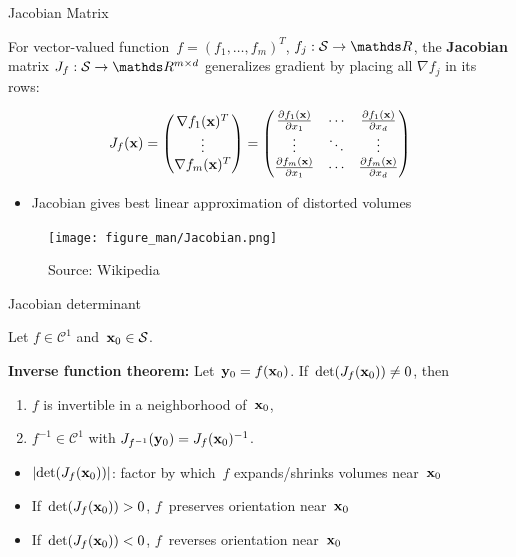 \documentclass[11pt,compress,t,notes=noshow, xcolor=table]{beamer}
\begin{document}
\begin{vbframe}{Jacobian Matrix}

For vector-valued function~$f = (f_1,\dots,f_m)^T$, $f_j:\mathcal{S}\to\R$, the \textbf{Jacobian} matrix $J_f:\mathcal{S} \to \R^{m\times d}$ generalizes gradient by placing all $\nabla f_j$ in its rows:

\begin{equation*}
    J_f(\mathbf{x}) = \begin{pmatrix}
        \nabla f_1(\mathbf{x})^T \\
        \vdots \\
        \nabla f_m(\mathbf{x})^T 
	\end{pmatrix}
    =
    \begin{pmatrix}
        \frac{\partial f_1(\mathbf{x})}{\partial x_1} & \cdots & \frac{\partial f_1(\mathbf{x})}{\partial x_d} \\
        \vdots &  \ddots & \vdots \\
        \frac{\partial f_m(\mathbf{x})}{\partial x_1} & \cdots & \frac{\partial f_m(\mathbf{x})}{\partial x_d}
	\end{pmatrix}
\end{equation*}

\begin{itemize}
    \item Jacobian gives best linear approximation of distorted volumes
\end{itemize}

\begin{figure}
    \centering
    \texttt{[image: figure\_man/Jacobian.png]}
    \caption*{\footnotesize Source: Wikipedia}
\end{figure}

\end{vbframe}


\begin{vbframe}{Jacobian determinant}

Let $f\in\mathcal{C}^1$ and~$\mathbf{x}_0\in\mathcal{S}$.

\begin{kframe}
    \textbf{Inverse function theorem:} Let~$\mathbf{y}_0=f(\mathbf{x}_0)$.
        If~$\det(J_f(\mathbf{x}_0))\not=0$, then
        \begin{enumerate}
            \item $f$ is invertible in a neighborhood of~$\mathbf{x}_0$,
            \item $f^{-1}\in\mathcal{C}^1$ with $J_{f^{-1}}(\mathbf{y}_0) = J_f(\mathbf{x}_0)^{-1}$.
        \end{enumerate}
\end{kframe}

\begin{itemize}
    \item $|{\det(J_f(\mathbf{x}_0))}|$: factor by which~$f$ expands/shrinks volumes near~$\mathbf{x}_0$
    \item If~$\det(J_f(\mathbf{x}_0))>0$, $f$~preserves orientation near~$\mathbf{x}_0$
    \item If~$\det(J_f(\mathbf{x}_0))<0$, $f$~reverses orientation near~$\mathbf{x}_0$
\end{itemize}

\end{vbframe}
\end{document}
